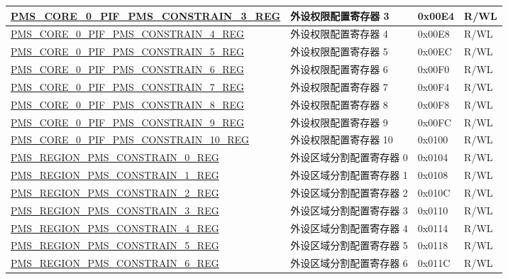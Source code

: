 \begin{longtable}{ | p{9.5cm} | p{7.5cm} | p{2cm} | p{} | }
\hyperref[regdesc:PMSCORE0PIFPMSCONSTRAIN3REG]{PMS\_CORE\_0\_PIF\_PMS\_CONSTRAIN\_3\_REG} & 外设权限配置寄存器 3 & 0x00E4 & R/WL \\ \hline
\hyperref[regdesc:PMSCORE0PIFPMSCONSTRAIN4REG]{PMS\_CORE\_0\_PIF\_PMS\_CONSTRAIN\_4\_REG} & 外设权限配置寄存器 4 & 0x00E8 & R/WL \\ \hline
\hyperref[regdesc:PMSCORE0PIFPMSCONSTRAIN5REG]{PMS\_CORE\_0\_PIF\_PMS\_CONSTRAIN\_5\_REG} & 外设权限配置寄存器 5 & 0x00EC & R/WL \\ \hline
\hyperref[regdesc:PMSCORE0PIFPMSCONSTRAIN6REG]{PMS\_CORE\_0\_PIF\_PMS\_CONSTRAIN\_6\_REG} & 外设权限配置寄存器 6 & 0x00F0 & R/WL \\ \hline
\hyperref[regdesc:PMSCORE0PIFPMSCONSTRAIN7REG]{PMS\_CORE\_0\_PIF\_PMS\_CONSTRAIN\_7\_REG} & 外设权限配置寄存器 7 & 0x00F4 & R/WL \\ \hline
\hyperref[regdesc:PMSCORE0PIFPMSCONSTRAIN8REG]{PMS\_CORE\_0\_PIF\_PMS\_CONSTRAIN\_8\_REG} & 外设权限配置寄存器 8 & 0x00F8 & R/WL \\ \hline
\hyperref[regdesc:PMSCORE0PIFPMSCONSTRAIN9REG]{PMS\_CORE\_0\_PIF\_PMS\_CONSTRAIN\_9\_REG} & 外设权限配置寄存器 9 & 0x00FC & R/WL \\ \hline
\hyperref[regdesc:PMSCORE0PIFPMSCONSTRAIN10REG]{PMS\_CORE\_0\_PIF\_PMS\_CONSTRAIN\_10\_REG} & 外设权限配置寄存器 10 & 0x0100 & R/WL \\ \hline
\hyperref[regdesc:PMSREGIONPMSCONSTRAIN0REG]{PMS\_REGION\_PMS\_CONSTRAIN\_0\_REG} & 外设区域分割配置寄存器 0 & 0x0104 & R/WL \\ \hline
\hyperref[regdesc:PMSREGIONPMSCONSTRAIN1REG]{PMS\_REGION\_PMS\_CONSTRAIN\_1\_REG} & 外设区域分割配置寄存器 1 & 0x0108 & R/WL \\ \hline
\hyperref[regdesc:PMSREGIONPMSCONSTRAIN2REG]{PMS\_REGION\_PMS\_CONSTRAIN\_2\_REG} & 外设区域分割配置寄存器 2 & 0x010C & R/WL \\ \hline
\hyperref[regdesc:PMSREGIONPMSCONSTRAIN3REG]{PMS\_REGION\_PMS\_CONSTRAIN\_3\_REG} & 外设区域分割配置寄存器 3 & 0x0110 & R/WL \\ \hline
\hyperref[regdesc:PMSREGIONPMSCONSTRAIN4REG]{PMS\_REGION\_PMS\_CONSTRAIN\_4\_REG} & 外设区域分割配置寄存器 4 & 0x0114 & R/WL \\ \hline
\hyperref[regdesc:PMSREGIONPMSCONSTRAIN5REG]{PMS\_REGION\_PMS\_CONSTRAIN\_5\_REG} & 外设区域分割配置寄存器 5 & 0x0118 & R/WL \\ \hline
\hyperref[regdesc:PMSREGIONPMSCONSTRAIN6REG]{PMS\_REGION\_PMS\_CONSTRAIN\_6\_REG} & 外设区域分割配置寄存器 6 & 0x011C & R/WL \\ \hline

\end{longtable}
